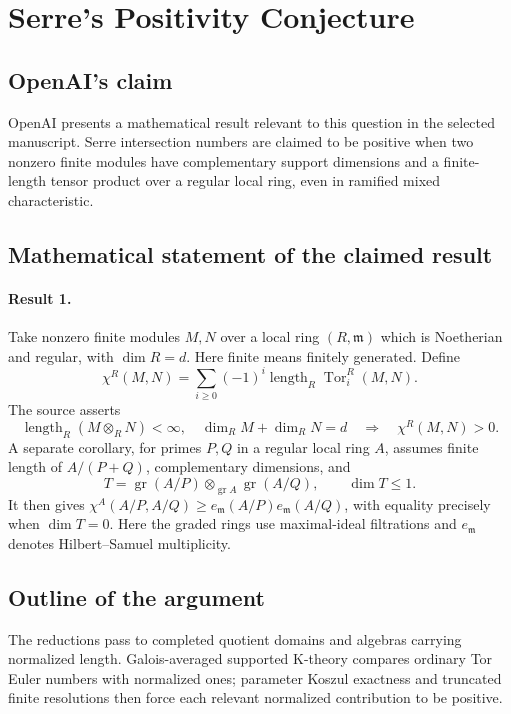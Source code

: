 \documentclass[11pt]{article}
\begin{document}
\section*{Serre's Positivity Conjecture}

\subsection{OpenAI's claim}
OpenAI presents a mathematical result relevant to this question in the selected manuscript. Serre intersection numbers are claimed to be positive when two nonzero finite modules have complementary support dimensions and a finite-length tensor product over a regular local ring, even in ramified mixed characteristic.

\subsection{Mathematical statement of the claimed result}
\paragraph{Result 1.} Take nonzero finite modules \(M,N\) over a local ring \((R,\mathfrak m)\) which is Noetherian and regular, with \(\dim R=d\). Here finite means finitely generated. Define
\[
 \chi^R(M,N)=\sum_{i\ge0}(-1)^i\operatorname{length}_R\operatorname{Tor}^R_i(M,N).
\]
The source asserts
\[
 \operatorname{length}_R(M\otimes_RN)<\infty,\quad
 \dim_RM+\dim_RN=d\quad\Longrightarrow\quad\chi^R(M,N)>0.
\]
A separate corollary, for primes \(P,Q\) in a regular local ring \(A\), assumes finite length of \(A/(P+Q)\), complementary dimensions, and
\[
 T=\operatorname{gr}(A/P)\otimes_{\operatorname{gr}A}\operatorname{gr}(A/Q),\qquad\dim T\le1.
\]
It then gives \(\chi^A(A/P,A/Q)\ge e_{\mathfrak m}(A/P)e_{\mathfrak m}(A/Q)\), with equality precisely when \(\dim T=0\). Here the graded rings use maximal-ideal filtrations and \(e_{\mathfrak m}\) denotes Hilbert--Samuel multiplicity.

\subsection{Outline of the argument}
The reductions pass to completed quotient domains and algebras carrying normalized length. Galois-averaged supported K-theory compares ordinary Tor Euler numbers with normalized ones; parameter Koszul exactness and truncated finite resolutions then force each relevant normalized contribution to be positive.
\end{document}
